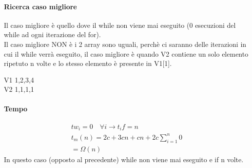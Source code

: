\paragraph*{Ricerca caso migliore}
Il caso migliore è quello dove il while non viene mai eseguito (0 esecuzioni del while
ad ogni iterazione del for).\\
Il caso migliore NON è i 2 array sono uguali, perchè ci saranno delle iterazioni in cui il while verrà
eseguito, il caso migliore è quando V2 contiene un solo elemento ripetuto n volte e lo stesso
elemento è presente in V1[1].
\begin{center}
    V1 1,2,3,4\\
    V2 1,1,1,1
\end{center}
\paragraph*{Tempo}
\begin{align*}
    tw_i = 0 \quad \forall i \rightarrow t_if = n\\
    t_m(n) = 2c + 3cn + cn + 2c \sum_{i=1}^n {0}\\
    =\Omega(n)
\end{align*}
In questo caso (opposto al precedente) while non viene mai eseguito e if n volte.\\
